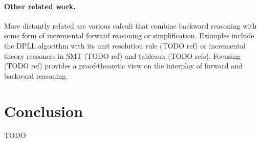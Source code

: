 \documentclass[runningheads]{llncs}
\begin{document}
\paragraph{Other related work.}
More distantly related are various calculi that combine backward reasoning with some form of incremental forward reasoning or simplification.
Examples include the DPLL algorithm with its unit resolution rule (TODO ref) or incremental theory reasoners in SMT (TODO ref) and tableaux (TODO refs).
Focusing (TODO ref) provides a proof-theoretic view on the interplay of forward and backward reasoning.

\section{Conclusion}

TODO
\end{document}
